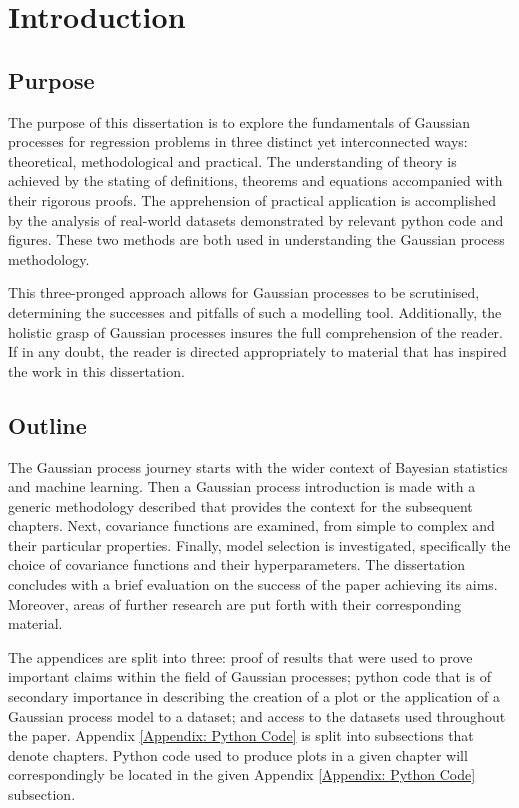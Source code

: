 \documentclass[12pt,a4paper]{article}
\begin{document}
\tableofcontents
\newpage

\section{Introduction}


\subsection{Purpose}

The purpose of this dissertation is to explore the fundamentals of Gaussian processes for regression problems in three distinct yet interconnected ways: theoretical, methodological and practical. The understanding of theory is achieved by the stating of definitions, theorems and equations accompanied with their rigorous proofs. The apprehension of practical application is accomplished by the analysis of real-world datasets demonstrated by relevant python code and figures. These two methods are both used in understanding the Gaussian process methodology. 

This three-pronged approach allows for Gaussian processes to be scrutinised, determining the successes and pitfalls of such a modelling tool. Additionally, the holistic grasp of Gaussian processes insures the full comprehension of the reader. If in any doubt, the reader is directed appropriately to material that has inspired the work in this dissertation.


\subsection{Outline}

The Gaussian process journey starts with the wider context of Bayesian statistics and machine learning. Then a Gaussian process introduction is made with a generic methodology described that provides the context for the subsequent chapters. Next, covariance functions are examined, from simple to complex and their particular properties. Finally, model selection is investigated, specifically the choice of covariance functions and their hyperparameters. The dissertation concludes with a brief evaluation on the success of the paper achieving its aims. Moreover, areas of further research are put forth with their corresponding material. 

The appendices are split into three: proof of results that were used to prove important claims within the field of Gaussian processes; python code that is of secondary importance in describing the creation of a plot or the application of a Gaussian process model to a dataset; and access to the datasets used throughout the paper. Appendix \ref{Appendix: Python Code} is split into subsections that denote chapters. Python code used to produce plots in a given chapter will correspondingly be located in the given Appendix \ref{Appendix: Python Code} subsection.  
\end{document}
